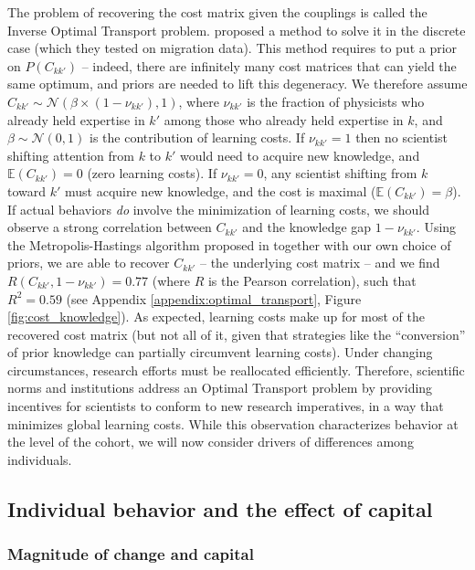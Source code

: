 \documentclass{article}
\begin{document}
The problem of recovering the cost matrix given the couplings is called the Inverse Optimal Transport problem. \citet{pmlr-v162-chiu22b} proposed a method to solve it in the discrete case (which they tested on migration data). This method requires to put a prior on $P(C_{kk'})$ -- indeed, there are infinitely many cost matrices that can yield the same optimum, and priors are needed to lift this degeneracy. We therefore assume $C_{kk'}\sim \mathcal{N}(\beta \times (1-\nu_{kk'}),1)$, where $\nu_{kk'}$ is the fraction of physicists who already held expertise in $k'$ among those who already held expertise in $k$, and $\beta\sim\mathcal{N}(0,1)$ is the contribution of learning costs. If $\nu_{kk'}=1$ then no scientist shifting attention from $k$ to $k'$ would need to acquire new knowledge, and $\mathbb{E}(C_{kk'})=0$ (zero learning costs). If $\nu_{kk'}=0$, any scientist shifting from $k$ toward $k'$ must acquire new knowledge, and the cost is maximal ($\mathbb{E}(C_{kk'})=\beta$). If actual behaviors \textit{do} involve the minimization of learning costs, we should observe a strong correlation between $C_{kk'}$ and the knowledge gap $1-\nu_{kk'}$.  Using the Metropolis-Hastings algorithm proposed in \citealt{pmlr-v162-chiu22b} together with our own choice of priors, we are able to recover $C_{kk'}$ -- the underlying cost matrix -- and we find $R(C_{kk'},1-\nu_{kk'})=0.77$ (where $R$ is the Pearson correlation), such that $R^2=0.59$ (see Appendix \ref{appendix:optimal_transport}, Figure \ref{fig:cost_knowledge}). As expected, learning costs make up for most of the recovered cost matrix (but 
 not all of it, given that strategies like the ``conversion'' of prior knowledge can partially circumvent learning costs). Under changing circumstances, research efforts must be reallocated efficiently. Therefore, scientific norms and institutions address an Optimal Transport problem by providing incentives for scientists to conform to new research imperatives, in a way that minimizes global learning costs. While this observation characterizes behavior at the level of the cohort, we will now consider drivers of differences among individuals. 

\subsection{\label{sec:magnitude}Individual behavior and the effect of capital}

\subsubsection{Magnitude of change and capital}
\end{document}
